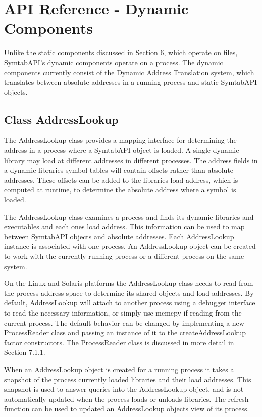 \section{API Reference - Dynamic Components}

Unlike the static components discussed in Section 6, which operate on files,
SymtabAPI's dynamic components operate on a process. The dynamic components currently consist of the Dynamic Address Translation system, which translates between absolute addresses in a running process and static SymtabAPI objects. 
\subsection{Class AddressLookup}

The AddressLookup class provides a mapping interface for determining the address in a process where a SymtabAPI object is loaded. A single dynamic library may load at different addresses in different processes. The address fields in a dynamic libraries symbol tables will contain offsets rather than absolute addresses. These offsets can be added to the libraries load address, which is computed at runtime, to determine the absolute address where a symbol is loaded. 

The AddressLookup class examines a process and finds its dynamic libraries and executables and each ones load address. This information can be used to map between SymtabAPI objects and absolute addresses. Each AddressLookup instance is associated with one process. An AddressLookup object can be created to work with the currently running process or a different process on the same system.

On the Linux and Solaris platforms the AddressLookup class needs to read from the process address space to determine its shared objects and load addresses. By default, AddressLookup will attach to another process using a debugger interface to read the necessary information, or simply use memcpy if reading from the current process. The default behavior can be changed by implementing a new ProcessReader class and passing an instance of it to the createAddressLookup factor constructors. The ProcessReader class is discussed in more detail in Section 7.1.1.

When an AddressLookup object is created for a running process it takes a snapshot of the process currently loaded libraries and their load addresses. This snapshot is used to answer queries into the AddressLookup object, and is not automatically updated when the process loads or unloads libraries. The refresh function can be used to updated an AddressLookup objects view of its process.

